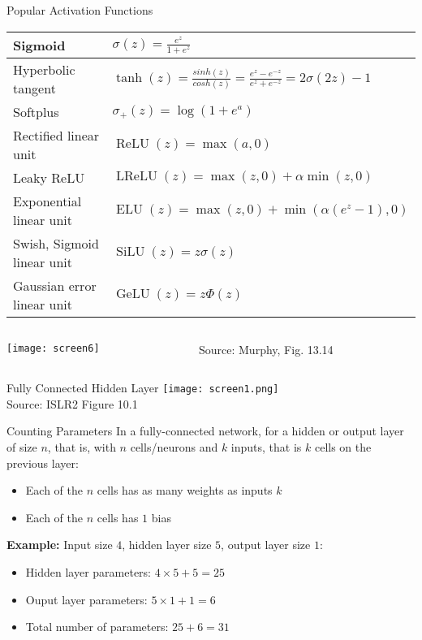 \documentclass[ignorenonframetext,xcolor=x11names]{beamer}
\begin{document}
\begin{frame}{Popular Activation Functions}
\footnotesize
\renewcommand{\arraystretch}{1.5}

\begin{tabular}{l|l} 
Sigmoid & $\sigma(z) = \frac{e^z}{1+e^z}$  \\ \hline
Hyperbolic tangent & $\tanh(z)=\frac{sinh(z)}{cosh(z)} = \frac{e^z-e^{-z}}{e^z+e^{-z}} = 2\sigma(2z)-1$  \\ \hline
Softplus & $\sigma_+(z) = \log(1+e^a)$ \\ \hline
Rectified linear unit & $\operatorname{ReLU}(z) = \max(a, 0) $ \\ \hline
Leaky ReLU & $\operatorname{LReLU}(z)=\max(z, 0) + \alpha \min(z, 0)$  \\ \hline
Exponential linear unit & $\operatorname{ELU}(z) = \max(z, 0) + \min(\alpha(e^z-1), 0)$ \\ \hline
Swish, Sigmoid linear unit & $\operatorname{SiLU}(z) = z \sigma(z)$ \\ \hline
Gaussian error linear unit & $\operatorname{GeLU}(z) = z \Phi(z)$ \\ 
\end{tabular}
\vspace{\baselineskip}
\begin{columns}
\begin{column}{\textwidth}
\texttt{[image: screen6]}
\end{column}
\begin{column}{0.1\textwidth}
\scriptsize Source: Murphy, Fig. 13.14
\end{column}
\end{columns}
\end{frame}



\begin{frame}{Fully Connected Hidden Layer}
\centering
\texttt{[image: screen1.png]} \\

\scriptsize Source: ISLR2 Figure 10.1
\end{frame}

\begin{frame}{Counting Parameters}
In a fully-connected network, for a hidden or output layer of size $n$, that is, with $n$ cells/neurons and $k$ inputs, that is $k$ cells on the previous layer:
\begin{itemize}
   \item Each of the $n$ cells has as many weights as inputs $k$
   \item Each of the $n$ cells has $1$ bias
\end{itemize}
\textbf{Example:} Input size $4$, hidden layer size $5$, output layer size $1$:
\begin{itemize}
   \item Hidden layer parameters: $4 \times 5 + 5 = 25$
   \item Ouput layer parameters: $5 \times 1 + 1 = 6$
   \item Total number of parameters: $25 + 6 = 31$
\end{itemize}
\end{frame}
\end{document}
